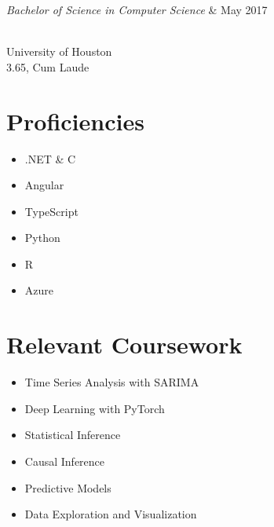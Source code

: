 \documentclass{res}
\begin{document}
{\begin{resume}
\begin{ncolumn}{2}
  {\it Bachelor of Science in Computer Science}  &   {\hspace*{\fill} May 2017}
\end{ncolumn}\\
University of Houston\\
3.65, Cum Laude

\begin{multicols}{2}
  \section{\bf Proficiencies}
  \begin{itemize}[noitemsep]
    \item .NET \& C\musSharp{}
    \item Angular
    \item TypeScript
    \item Python
    \item R
    \item Azure
  \end{itemize}
  
  \section{\bf Relevant Coursework}
  \begin{itemize}[noitemsep]
    \item Time Series Analysis with SARIMA
    \item Deep Learning with PyTorch
    \item Statistical Inference
    \item Causal Inference
    \item Predictive Models
    \item Data Exploration and Visualization
  \end{itemize}
\end{multicols}

\end{resume}

\vfill}
\end{document}
